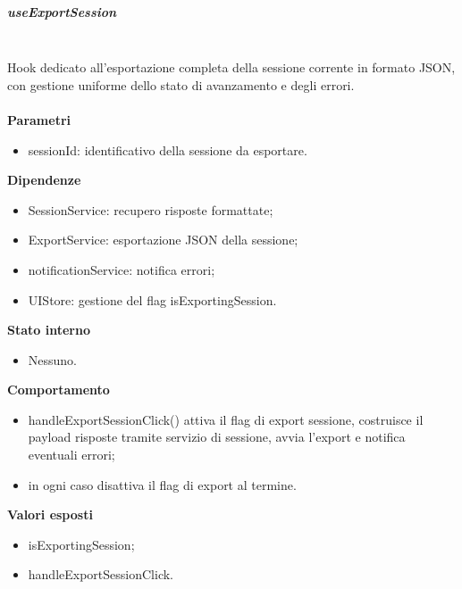 \documentclass[a4paper,12pt]{article}
\begin{document}
                \subparagraph{useExportSession}\mbox{}\\
                Hook dedicato all'esportazione completa della sessione corrente in formato JSON, con gestione uniforme dello stato di avanzamento e degli errori.\\\\
                \textbf{Parametri}
                \begin{itemize}
                    \item {\ttfamily sessionId}: identificativo della sessione da esportare.
                \end{itemize}
                \textbf{Dipendenze}
                \begin{itemize}
                    \item {\ttfamily SessionService}: recupero risposte formattate;
                    \item {\ttfamily ExportService}: esportazione JSON della sessione;
                    \item {\ttfamily notificationService}: notifica errori;
                    \item {\ttfamily UIStore}: gestione del flag {\ttfamily isExportingSession}.
                \end{itemize}
                \textbf{Stato interno}
                \begin{itemize}
                    \item Nessuno.
                \end{itemize}
                \textbf{Comportamento}
                \begin{itemize}
                    \item {\ttfamily handleExportSessionClick()} attiva il flag di export sessione, costruisce il payload risposte tramite servizio di sessione, avvia l'export e notifica eventuali errori;
                    \item in ogni caso disattiva il flag di export al termine.
                \end{itemize}
                \textbf{Valori esposti}
                \begin{itemize}
                    \item {\ttfamily isExportingSession};
                    \item {\ttfamily handleExportSessionClick}.
                \end{itemize}
                
\end{document}
